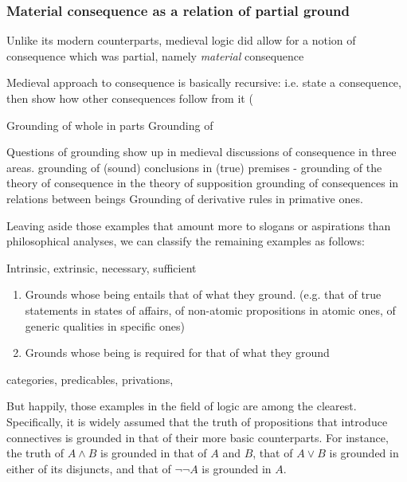 \subsubsection{Material consequence as a relation of partial ground}
Unlike its modern counterparts, medieval logic did allow for a notion of consequence which was partial, namely \textit{material} consequence



Medieval approach to consequence is basically recursive: i.e. state a consequence, then show how other consequences follow from it (%

Grounding of whole in parts
Grounding of 

Questions of grounding show up in medieval discussions of consequence in three areas.
  grounding of (sound) conclusions in (true) premises - %
  grounding of the theory of consequence in the theory of supposition
  grounding of consequences in relations between beings 
  Grounding of derivative rules in primative ones.

Leaving aside those examples that amount more to slogans or aspirations than philosophical analyses, we can classify the remaining examples as follows: 

Intrinsic, extrinsic, necessary, sufficient
\begin{enumerate}
  \item Grounds whose being entails that of what they ground. (e.g. that of true statements in states of affairs, of non-atomic propositions in atomic ones, of generic qualities in specific ones)
  \item Grounds whose being is required for that of what they ground
\end{enumerate}

categories, predicables, privations, 



But happily, those examples in the field of logic are among the clearest. Specifically, it is widely assumed that the truth of propositions that introduce connectives is grounded in that of their more basic counterparts. For instance, the truth of $A \wedge B$ is grounded in that of $A$ and $B$, that of $A \vee B$ is grounded in either of its disjuncts, and that of $\neg\neg A$ is grounded in $A$.

